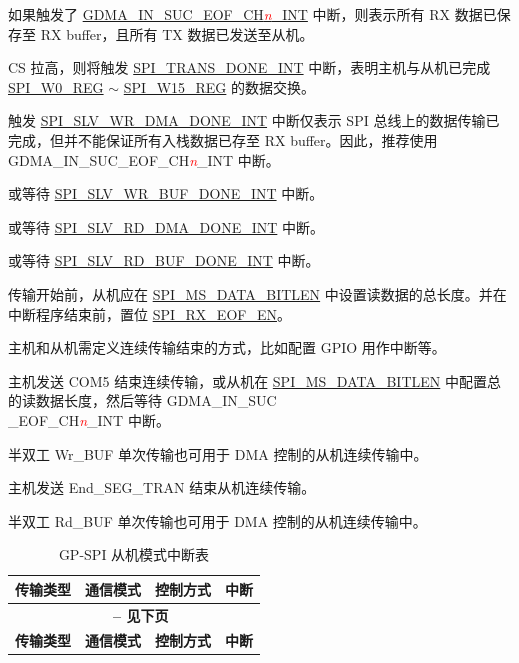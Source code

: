 \documentclass[main\_\_CN.tex]{subfiles}
\begin{document}
\begin{ThreePartTable}

\begin{TableNotes}
    \item[1] 如果触发了  \hyperref[int:GDMAINSUCEOFINT]{GDMA\_IN\_SUC\_EOF\_CH\textcolor{red}{\it{n}}\_INT}  中断，则表示所有 RX 数据已保存至 RX buffer，且所有 TX 数据已发送至从机。
    \item[2] CS 拉高，则将触发  \hyperref[int:SPITRANSDONEINT]{SPI\_TRANS\_DONE\_INT} 中断，表明主机与从机已完成  \hyperref[regdesc:SPIW0REG]{SPI\_W0\_REG} $\sim$ \hyperref[regdesc:SPIW15REG]{SPI\_W15\_REG} 的数据交换。
    \item[3] 触发  \hyperref[int:SPISLVWRDMADONEINT]{SPI\_SLV\_WR\_DMA\_DONE\_INT} 中断仅表示 SPI 总线上的数据传输已完成，但并不能保证所有入栈数据已存至 RX buffer。因此，推荐使用 GDMA\_IN\_SUC\_EOF\_CH\textcolor{red}{\it{n}}\_INT 中断。
    \item[4] 或等待 \hyperref[int:SPISLVWRBUFDONEINT]{SPI\_SLV\_WR\_BUF\_DONE\_INT} 中断。
    \item[5] 或等待 \hyperref[int:SPISLVRDDMADONEINT]{SPI\_SLV\_RD\_DMA\_DONE\_INT} 中断。
    \item[6] 或等待 \hyperref[int:SPISLVRDBUFDONEINT]{SPI\_SLV\_RD\_BUF\_DONE\_INT} 中断。
    \item[7] 传输开始前，从机应在  \hyperref[fielddesc:SPIMSDATABITLEN]{SPI\_MS\_DATA\_BITLEN} 中设置读数据的总长度。并在中断程序结束前，置位 \hyperref[fielddesc:SPIRXEOFEN]{SPI\_RX\_EOF\_EN}。
    \item[8] 主机和从机需定义连续传输结束的方式，比如配置 GPIO 用作中断等。
    \item[9] 主机发送 COM5 结束连续传输，或从机在  \hyperref[fielddesc:SPIMSDATABITLEN]{SPI\_MS\_DATA\_BITLEN} 中配置总的读数据长度，然后等待 GDMA\_IN\_SUC\\\_EOF\_CH\textcolor{red}{\it{n}}\_INT 中断。
    \item[10] 半双工 Wr\_BUF 单次传输也可用于 DMA 控制的从机连续传输中。
    \item[11] 主机发送 End\_SEG\_TRAN 结束从机连续传输。
    \item[12] 半双工 Rd\_BUF 单次传输也可用于 DMA 控制的从机连续传输中。
\end{TableNotes}

\begin{longtable}[c]{|l|l|l|l|}
\caption{GP-SPI 从机模式中断表}
\label{Table:Slv_Int_Table}
\\\hline

\rowcolor{lightgray}
\textbf{传输类型 } & \textbf{ 通信模式} & \textbf{ 控制方式} & \textbf{ 中断 } \\\hline
    \endfirsthead
    \multicolumn{4}{c}{\bfseries \tablename\ \thetable{} -- 见下页}\\\hline
    \rowcolor{lightgray}
    \textbf{传输类型 } & \textbf{ 通信模式} & \textbf{ 控制方式} & \textbf{ 中断 }\\\hline
    \endhead


\end{longtable}
\end{ThreePartTable}
\end{document}
